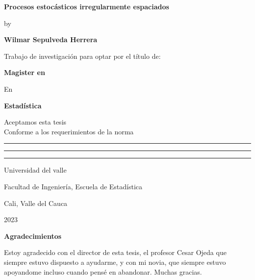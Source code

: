 \begin{center}
\textbf{\huge Procesos estocásticos irregularmente espaciados}\vspace*{1.0cm}

by\vspace*{0.5cm}

\Large\textbf{Wilmar Sepulveda Herrera}\vspace*{1.0cm}

\small Trabajo de investigación para optar por el título de:\vspace*{1.0cm}

\textbf{Magister en}\vspace*{0.5cm}

En\vspace*{0.5cm}

\textbf{Estadística}\vspace*{1.5cm}

Aceptamos esta tesis\\
Conforme a los requerimientos de la norma\vspace*{1.0cm}

\rule{10cm}{1pt}\vspace*{0.7cm}
\rule{10cm}{1pt}\vspace*{0.7cm}
\rule{10cm}{1pt}\vspace*{2.3cm}

\small Universidad del valle

Facultad de Ingeniería, Escuela de Estadística

Cali, Valle del Cauca

2023
\end{center}


\newpage

\thispagestyle{empty}

\vspace*{1cm}

\textbf{\LARGE Agradecimientos}\vspace*{1.0cm}

Estoy agradecido con el director de esta tesis, el profesor Cesar Ojeda que siempre estuvo dispuesto a ayudarme, y con mi novia, que siempre estuvo apoyandome incluso cuando pensé en abandonar. Muchas gracias.

\newpage{\pagestyle{empty}\cleardoublepage}

\newpage


